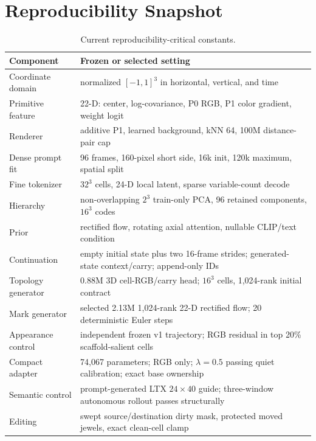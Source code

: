 \documentclass[10pt]{article}
\begin{document}
\appendix
\section{Reproducibility Snapshot}

\begin{table}[H]
\centering
\small
\caption{Current reproducibility-critical constants.}
\begin{tabularx}{\linewidth}{@{}lX@{}}
\toprule
Component & Frozen or selected setting \\
\midrule
Coordinate domain & normalized $[-1,1]^3$ in horizontal, vertical, and time \\
Primitive feature & 22-D: center, log-covariance, P0 RGB, P1 color gradient, weight logit \\
Renderer & additive P1, learned background, kNN 64, 100M distance-pair cap \\
Dense prompt fit & 96 frames, 160-pixel short side, 16k init, 120k maximum, spatial split \\
Fine tokenizer & $32^3$ cells, 24-D local latent, sparse variable-count decode \\
Hierarchy & non-overlapping $2^3$ train-only PCA, 96 retained components, $16^3$ codes \\
Prior & rectified flow, rotating axial attention, nullable CLIP/text condition \\
Continuation & empty initial state plus two 16-frame strides; generated-state context/carry; append-only IDs \\
Topology generator & 0.88M 3D cell-RGB/carry head; $16^3$ cells, 1,024-rank initial contract \\
Mark generator & selected 2.13M 1,024-rank 22-D rectified flow; 20 deterministic Euler steps \\
Appearance control & independent frozen v1 trajectory; RGB residual in top 20\% scaffold-salient cells \\
Compact adapter & 74,067 parameters; RGB only; $\lambda=0.5$ passing quiet calibration; exact base ownership \\
Semantic control & prompt-generated LTX \(24\times40\) guide; three-window autonomous rollout passes structurally \\
Editing & swept source/destination dirty mask, protected moved jewels, exact clean-cell clamp \\
\bottomrule
\end{tabularx}
\end{table}
\end{document}
